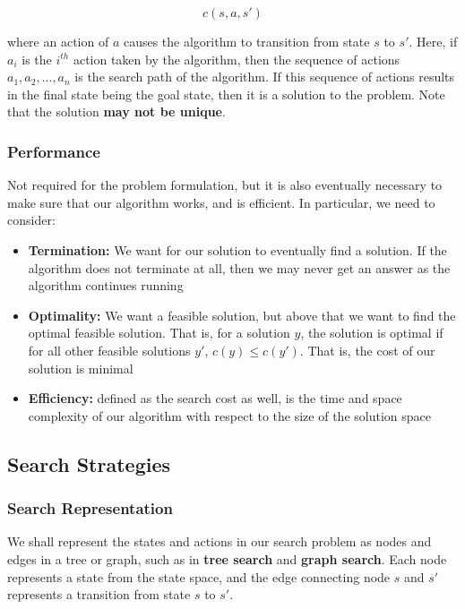\documentclass[12pt]{article}
\begin{document}
\begin{equation*}
c(s, a, s')
\end{equation*}

where an action of $a$ causes the algorithm to transition from state $s$ to $s'$. Here, if $a_i$ is the $i^{th}$ action taken by the algorithm, then the sequence of actions $a_1, a_2, ..., a_n$ is the search path of the algorithm. If this sequence of actions results in the final state being the goal state, then it is a solution to the problem. Note that the solution \textbf{may not be unique}.

\subsubsection{Performance}

Not required for the problem formulation, but it is also eventually necessary to make sure that our algorithm works, and is efficient. In particular, we need to consider:

\begin{itemize}
\item \textbf{Termination:} We want for our solution to eventually find a solution. If the algorithm does not terminate at all, then we may never get an answer as the algorithm continues running
\item \textbf{Optimality:} We want a feasible solution, but above that we want to find the optimal feasible solution. That is, for a solution $y$, the solution is optimal if for all other feasible solutions $y'$, $c(y) \leq c(y')$. That is, the cost of our solution is minimal
\item \textbf{Efficiency:} defined as the search cost as well, is the time and space complexity of our algorithm with respect to the size of the solution space
\end{itemize}

\subsection{Search Strategies}

\subsubsection{Search Representation}

We shall represent the states and actions in our search problem as nodes and edges in a tree or graph, such as in \textbf{tree search} and \textbf{graph search}. Each node represents a state from the state space, and the edge connecting node $s$ and $s'$ represents a transition from state $s$ to $s'$.\\
\end{document}
